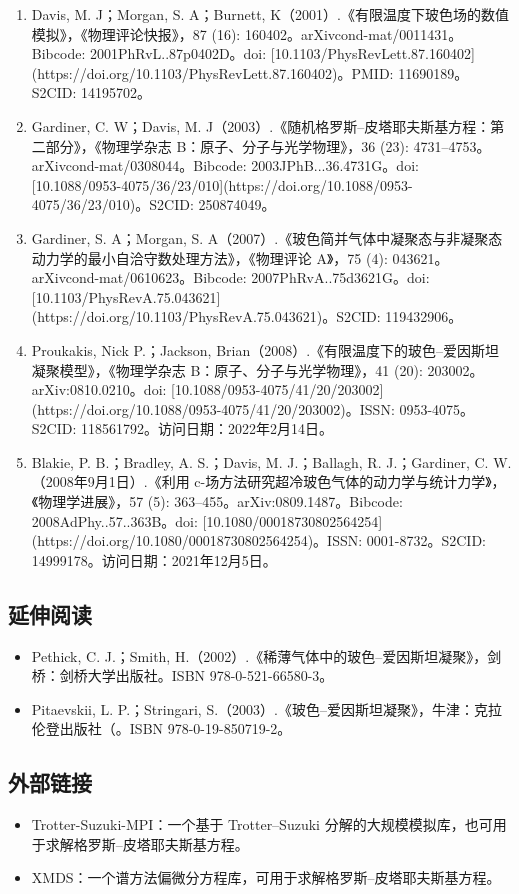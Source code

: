 \begin{enumerate}
\item Davis, M. J；Morgan, S. A；Burnett, K（2001）.《有限温度下玻色场的数值模拟》，《物理评论快报》，87 (16): 160402。arXiv\:cond-mat/0011431。Bibcode: 2001PhRvL..87p0402D。doi: [10.1103/PhysRevLett.87.160402](https://doi.org/10.1103/PhysRevLett.87.160402)。PMID: 11690189。S2CID: 14195702。
\item Gardiner, C. W；Davis, M. J（2003）.《随机格罗斯–皮塔耶夫斯基方程：第二部分》，《物理学杂志 B：原子、分子与光学物理》，36 (23): 4731–4753。arXiv\:cond-mat/0308044。Bibcode: 2003JPhB...36.4731G。doi: [10.1088/0953-4075/36/23/010](https://doi.org/10.1088/0953-4075/36/23/010)。S2CID: 250874049。
\item Gardiner, S. A；Morgan, S. A（2007）.《玻色简并气体中凝聚态与非凝聚态动力学的最小自洽守数处理方法》，《物理评论 A》，75 (4): 043621。arXiv\:cond-mat/0610623。Bibcode: 2007PhRvA..75d3621G。doi: [10.1103/PhysRevA.75.043621](https://doi.org/10.1103/PhysRevA.75.043621)。S2CID: 119432906。
\item Proukakis, Nick P.；Jackson, Brian（2008）.《有限温度下的玻色–爱因斯坦凝聚模型》，《物理学杂志 B：原子、分子与光学物理》，41 (20): 203002。arXiv:0810.0210。doi: [10.1088/0953-4075/41/20/203002](https://doi.org/10.1088/0953-4075/41/20/203002)。ISSN: 0953-4075。S2CID: 118561792。访问日期：2022年2月14日。
\item Blakie, P. B.；Bradley, A. S.；Davis, M. J.；Ballagh, R. J.；Gardiner, C. W.（2008年9月1日）.《利用 c-场方法研究超冷玻色气体的动力学与统计力学》，《物理学进展》，57 (5): 363–455。arXiv:0809.1487。Bibcode: 2008AdPhy..57..363B。doi: [10.1080/00018730802564254](https://doi.org/10.1080/00018730802564254)。ISSN: 0001-8732。S2CID: 14999178。访问日期：2021年12月5日。
\end{enumerate}
\subsection{延伸阅读}
\begin{itemize}
\item Pethick, C. J.；Smith, H.（2002）.《稀薄气体中的玻色–爱因斯坦凝聚》，剑桥：剑桥大学出版社。ISBN 978-0-521-66580-3。
\item Pitaevskii, L. P.；Stringari, S.（2003）.《玻色–爱因斯坦凝聚》，牛津：克拉伦登出版社（。ISBN 978-0-19-850719-2。
\end{itemize}
\subsection{外部链接}
\begin{itemize}
\item Trotter-Suzuki-MPI：一个基于 Trotter–Suzuki 分解的大规模模拟库，也可用于求解格罗斯–皮塔耶夫斯基方程。
\item XMDS：一个谱方法偏微分方程库，可用于求解格罗斯–皮塔耶夫斯基方程。
\end{itemize}
